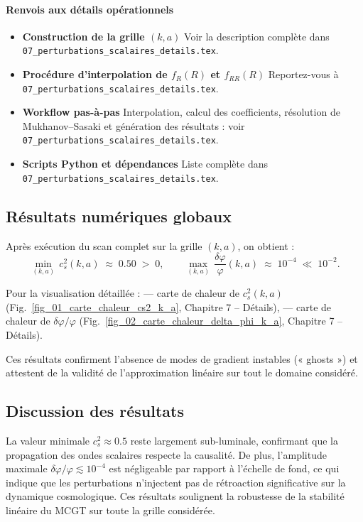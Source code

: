 \paragraph*{Renvois aux détails opérationnels}
\begin{itemize}
  \item \textbf{Construction de la grille \((k,a)\)}
        Voir la description complète dans \texttt{07\_perturbations\_scalaires\_details.tex}.
  \item \textbf{Procédure d’interpolation de \(f_{R}(R)\) et \(f_{RR}(R)\)}
        Reportez-vous à \texttt{07\_perturbations\_scalaires\_details.tex}.
  \item \textbf{Workflow pas-à-pas}
        Interpolation, calcul des coefficients, résolution de Mukhanov–Sasaki et génération des résultats : voir \texttt{07\_perturbations\_scalaires\_details.tex}.
  \item \textbf{Scripts Python et dépendances}
        Liste complète dans \texttt{07\_perturbations\_scalaires\_details.tex}.
\end{itemize}

\subsection{Résultats numériques globaux}
Après exécution du scan complet sur la grille \((k,a)\), on obtient :
\[
  \min_{(k,a)}\,c_{s}^{2}(k,a)\;\approx\;0.50\;>\;0,
  \qquad
  \max_{(k,a)}\,\frac{\delta\varphi}{\varphi}(k,a)\;\approx\;10^{-4}\;\ll\;10^{-2}.
\]

Pour la visualisation détaillée :
— carte de chaleur de \(c_{s}^{2}(k,a)\) (Fig.~\ref{fig_01_carte_chaleur_cs2_k_a}, Chapitre 7 – Détails),
— carte de chaleur de \(\delta\varphi/\varphi\) (Fig.~\ref{fig_02_carte_chaleur_delta_phi_k_a}, Chapitre 7 – Détails).

Ces résultats confirment l’absence de modes de gradient instables (« ghosts ») et attestent de la validité de l’approximation linéaire sur tout le domaine considéré.

\subsection{Discussion des résultats}
La valeur minimale \(c_{s}^{2}\approx0.5\) reste largement sub-luminale, confirmant que la propagation des ondes scalaires respecte la causalité. De plus, l’amplitude maximale \(\delta\varphi/\varphi\lesssim10^{-4}\) est négligeable par rapport à l’échelle de fond, ce qui indique que les perturbations n’injectent pas de rétroaction significative sur la dynamique cosmologique. Ces résultats soulignent la robustesse de la stabilité linéaire du MCGT sur toute la grille considérée.

